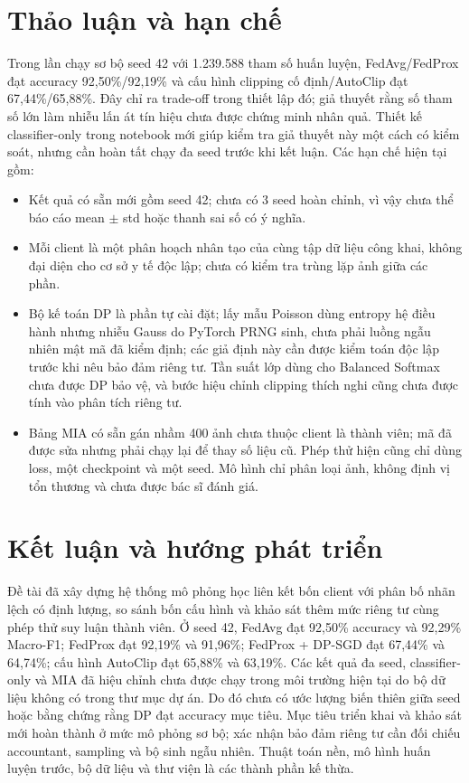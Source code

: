 \documentclass[12pt,a4paper]{report}
\begin{document}
\section{Thảo luận và hạn chế}\label{sec:hanche}
Trong lần chạy sơ bộ seed 42 với 1.239.588 tham số huấn luyện, FedAvg/FedProx đạt accuracy 92,50\%/92,19\% và cấu hình clipping cố định/AutoClip đạt 67,44\%/65,88\%. Đây chỉ ra trade-off trong thiết lập đó; giả thuyết rằng số tham số lớn làm nhiễu lấn át tín hiệu chưa được chứng minh nhân quả. Thiết kế classifier-only trong notebook mới giúp kiểm tra giả thuyết này một cách có kiểm soát, nhưng cần hoàn tất chạy đa seed trước khi kết luận. Các hạn chế hiện tại gồm:
\begin{itemize}
\item Kết quả có sẵn mới gồm seed 42; chưa có 3 seed hoàn chỉnh, vì vậy chưa thể báo cáo mean $\pm$ std hoặc thanh sai số có ý nghĩa.
\item Mỗi client là một phân hoạch nhân tạo của cùng tập dữ liệu công khai, không đại diện cho cơ sở y tế độc lập; chưa có kiểm tra trùng lặp ảnh giữa các phần.
\item Bộ kế toán DP là phần tự cài đặt; lấy mẫu Poisson dùng entropy hệ điều hành nhưng nhiễu Gauss do PyTorch PRNG sinh, chưa phải luồng ngẫu nhiên mật mã đã kiểm định; các giả định này cần được kiểm toán độc lập trước khi nêu bảo đảm riêng tư. Tần suất lớp dùng cho Balanced Softmax chưa được DP bảo vệ, và bước hiệu chỉnh clipping thích nghi cũng chưa được tính vào phân tích riêng tư.
\item Bảng MIA có sẵn gán nhầm 400 ảnh chưa thuộc client là thành viên; mã đã được sửa nhưng phải chạy lại để thay số liệu cũ. Phép thử hiện cũng chỉ dùng loss, một checkpoint và một seed. Mô hình chỉ phân loại ảnh, không định vị tổn thương và chưa được bác sĩ đánh giá.
\end{itemize}

\section{Kết luận và hướng phát triển}
Đề tài đã xây dựng hệ thống mô phỏng học liên kết bốn client với phân bố nhãn lệch có định lượng, so sánh bốn cấu hình và khảo sát thêm mức riêng tư cùng phép thử suy luận thành viên. Ở seed 42, FedAvg đạt 92,50\% accuracy và 92,29\% Macro-F1; FedProx đạt 92,19\% và 91,96\%; FedProx + DP-SGD đạt 67,44\% và 64,74\%; cấu hình AutoClip đạt 65,88\% và 63,19\%. Các kết quả đa seed, classifier-only và MIA đã hiệu chỉnh chưa được chạy trong môi trường hiện tại do bộ dữ liệu không có trong thư mục dự án. Do đó chưa có ước lượng biến thiên giữa seed hoặc bằng chứng rằng DP đạt accuracy mục tiêu. Mục tiêu triển khai và khảo sát mới hoàn thành ở mức mô phỏng sơ bộ; xác nhận bảo đảm riêng tư cần đối chiếu accountant, sampling và bộ sinh ngẫu nhiên. Thuật toán nền, mô hình huấn luyện trước, bộ dữ liệu và thư viện là các thành phần kế thừa.
\end{document}
